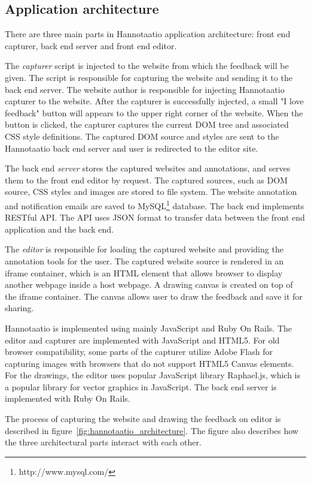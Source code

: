 \documentclass[english,12pt,a4paper,pdftex]{article}
\begin{document}
\subsection{Application architecture}

There are three main parts in Hannotaatio application architecture: front end capturer, back end server and front end editor. 

The \emph{capturer} script is injected to the website from which the feedback will be given. The script is responsible for capturing the website and sending it to the back end server. The website author is responsible for injecting Hannotaatio capturer to the website. After the capturer is successfully injected, a small "I love feedback" button will appears to the upper right corner of the website. When the button is clicked, the capturer captures the current \ac{DOM} tree and associated \ac{CSS} style definitions. The captured \ac{DOM} source and styles are sent to the Hannotaatio back end server and user is redirected to the editor site.

The back end \emph{server} stores the captured websites and annotations, and serves them to the front end editor by request. The captured sources, such as \ac{DOM} source, \ac{CSS} styles and images are stored to file system. The website annotation and notification emails are saved to MySQL\footnote{http://www.mysql.com/} database. The back end implements RESTful \ac{API}. The \ac{API} uses JSON format to transfer data between the front end application and the back end.

The \emph{editor} is responsible for loading the captured website and providing the annotation tools for the user.  The captured website source is rendered in an iframe container, which is an HTML element that allows browser to display another webpage inside a host webpage. A drawing canvas is created on top of the iframe container. The canvas allows user to draw the feedback and save it for sharing.

Hannotaatio is implemented using mainly JavaScript and Ruby On Rails. The editor and capturer are implemented with JavaScript and HTML5. For old browser compatibility, some parts of the capturer utilize Adobe Flash for capturing images with browsers that do not support HTML5 Canvas elements. For the drawings, the editor uses popular JavaScript library Raphael.js, which is a popular library for vector graphics in JavaScript. The back end server is implemented with Ruby On Rails.

The process of capturing the website and drawing the feedback on editor is described in figure~\ref{fig:hannotaatio_architecture}. The figure also describes how the three architectural parts interact with each other.
\end{document}
